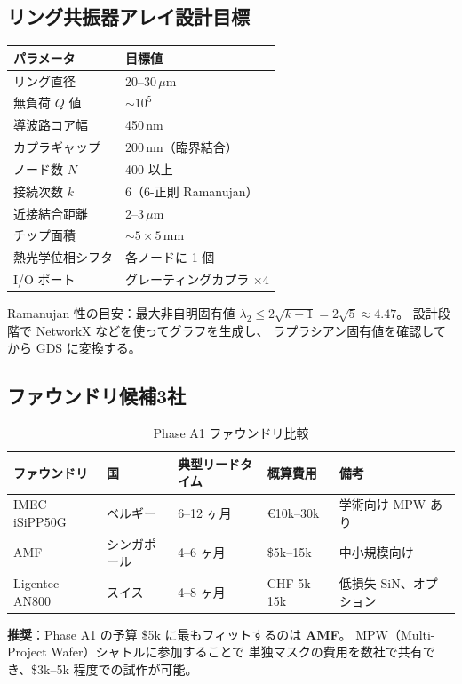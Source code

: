 \documentclass[11pt,a4paper]{article}
\begin{document}
\subsection{リング共振器アレイ設計目標}

\begin{center}
\begin{tabular}{ll}
\toprule
パラメータ & 目標値 \\
\midrule
リング直径 & 20--30\,$\mu$m \\
無負荷 $Q$ 値 & $\sim 10^5$ \\
導波路コア幅 & 450\,nm \\
カプラギャップ & 200\,nm（臨界結合） \\
ノード数 $N$ & 400 以上 \\
接続次数 $k$ & 6（6-正則 Ramanujan） \\
近接結合距離 & 2--3\,$\mu$m \\
チップ面積 & $\sim 5\times 5$\,mm \\
熱光学位相シフタ & 各ノードに 1 個 \\
I/O ポート & グレーティングカプラ $\times 4$ \\
\bottomrule
\end{tabular}
\end{center}

Ramanujan 性の目安：最大非自明固有値 $\lambda_2 \leq 2\sqrt{k-1} = 2\sqrt{5}\approx 4.47$。
設計段階で NetworkX などを使ってグラフを生成し、
ラプラシアン固有値を確認してから GDS に変換する。

\subsection{ファウンドリ候補3社}

\begin{table}[h]
\centering
\caption{Phase A1 ファウンドリ比較}
\small
\begin{tabular}{lllll}
\toprule
ファウンドリ & 国 & 典型リードタイム & 概算費用 & 備考 \\
\midrule
IMEC iSiPP50G & ベルギー & 6--12 ヶ月 & €10k--30k & 学術向け MPW あり \\
AMF & シンガポール & 4--6 ヶ月 & \$5k--15k & 中小規模向け \\
Ligentec AN800 & スイス & 4--8 ヶ月 & CHF 5k--15k & 低損失 SiN、オプション \\
\bottomrule
\end{tabular}
\end{table}

\textbf{推奨}：Phase A1 の予算 \$5k に最もフィットするのは \textbf{AMF}。
MPW（Multi-Project Wafer）シャトルに参加することで
単独マスクの費用を数社で共有でき、\$3k--5k 程度での試作が可能。
\end{document}
